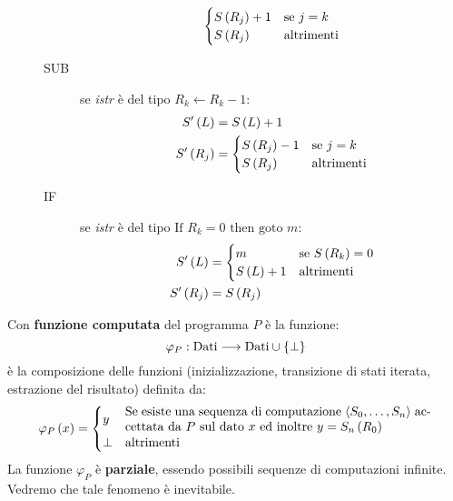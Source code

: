\documentclass{lectures}
\begin{document}
\begin{multicols}{2}
\begin{definition}
\begin{description}
\begin{description}
\begin{align*}
\begin{cases}
                            S\left(R_j\right)+1 & \text{se }j=k\\
                            S\left(R_j\right) & \text{altrimenti}
                        \end{cases}
                    \end{align*}
                    \item[SUB] se \textit{istr} è del tipo \(R_k \leftarrow R_k - 1\):
                    \begin{align*}
                        S'\left(L\right) &= S\left(L\right) +1\\
                        S'\left(R_j\right) &= \begin{cases}
                            S\left(R_j\right)-1 & \text{se }j=k\\
                            S\left(R_j\right) & \text{altrimenti}
                        \end{cases}
                    \end{align*}
                    \item[IF] se \textit{istr} è del tipo \(\text{If }R_k=0\text{ then goto }m\):
                    \begin{align*}
                        S'\left(L\right) &= \begin{cases}
                            m & \text{se }S\left(R_k\right)=0\\
                            S\left(L\right)+1 & \text{altrimenti}
                        \end{cases}\\
                        S'\left(R_j\right) &= S\left(R_j\right)\\
                    \end{align*}
                \end{description}
        \end{description}
    \end{definition}
    \begin{definition}
        Con \textbf{funzione computata} del programma \(P\) è la funzione:
        \[
            \varphi_P:\text{Dati}\longrightarrow \text{Dati}\cup\left\{\bot\right\}
        \]
        è la composizione delle funzioni (inizializzazione, transizione di stati iterata, estrazione del risultato) definita da:
        \[
            \varphi_P\rnd{x} = \begin{cases}
                y & \parbox{0.7\textwidth}{Se esiste una sequenza di computazione \(\ngle{S_0, \ldots, S_n}\) accettata da \(P\) sul dato \(x\) ed inoltre \(y = S_n\rnd{R_0}\)}\\
                \bot & \text{altrimenti}
            \end{cases}
        \]
        La funzione \(\varphi_P\) è \textbf{parziale}, essendo possibili sequenze di computazioni infinite. Vedremo che tale fenomeno è inevitabile.
    \end{definition}
\end{multicols}
\clearpage
\end{document}
